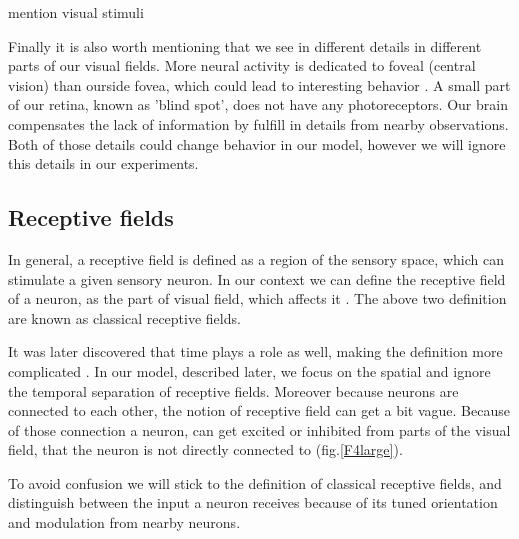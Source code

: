 mention visual stimuli

Finally it is also worth mentioning that we see in different details in different parts of our visual fields. More neural activity is dedicated to foveal (central vision) than ourside fovea, which could lead to interesting behavior \cite{knight2008drastically}. A small part of our retina, known as 'blind spot', does not have any photoreceptors. Our brain compensates the lack of information by fulfill in details from nearby observations. Both of those details could change behavior in our model, however we will ignore this details in our experiments.


\subsection{Receptive fields}

In general, a receptive field is defined as a region of the sensory space, which can stimulate a given sensory neuron. In our context we can define the receptive field of a neuron, as the part of visual field, which affects it \cite{Hartline700}. The above two definition are known as classical receptive fields.

It was later discovered that time plays a role as well, making the definition more complicated \cite{deangelis1995receptive}. In our model, described later, we focus on the spatial and ignore the temporal separation of receptive fields. Moreover because neurons are connected to each other, the notion of receptive field can get a bit vague. Because of those connection a neuron, can get excited or inhibited from parts of the visual field, that the neuron is not directly connected to (fig.\ref{F4large}).

To avoid confusion we will stick to the definition of classical receptive fields, and distinguish between the input a neuron receives because of its tuned orientation and modulation from nearby neurons.


